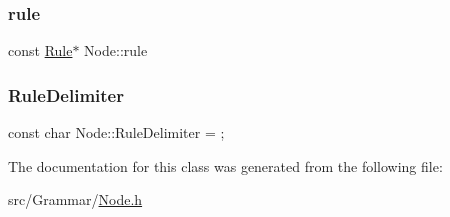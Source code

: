 \mbox{\label{class_node_a02f5c9463cceb270ad5730760f19c722}} 
\subsubsection{\texorpdfstring{rule}{rule}}
{\footnotesize\ttfamily const \hyperlink{class_rule}{Rule}$\ast$ Node\+::rule}

\mbox{\label{class_node_ab58932e82964fb75ba806870c4069dc2}} 
\subsubsection{\texorpdfstring{Rule\+Delimiter}{RuleDelimiter}}
{\footnotesize\ttfamily const char Node\+::\+Rule\+Delimiter = \textquotesingle{};\textquotesingle{}\hspace{0.3cm}{\ttfamily [static]}}



The documentation for this class was generated from the following file\+:\begin{DoxyCompactItemize}
\item 
src/\+Grammar/\hyperlink{_node_8h}{Node.\+h}\end{DoxyCompactItemize}
